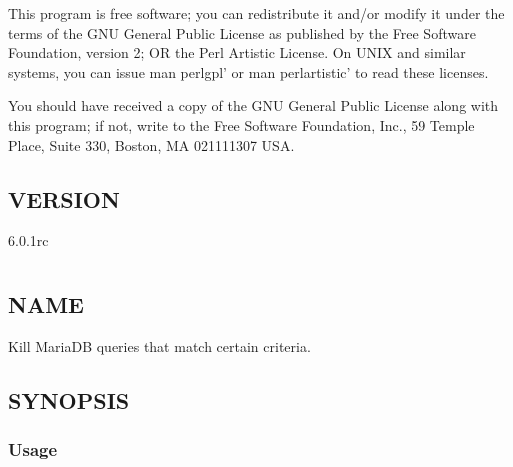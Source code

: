 \documentclass[letterpaper,10pt,english]{sphinxmanual}
\begin{document}
\sphinxAtStartPar
This program is free software; you can redistribute it and/or modify it under
the terms of the GNU General Public License as published by the Free Software
Foundation, version 2; OR the Perl Artistic License.  On UNIX and similar
systems, you can issue \textasciigrave{}man perlgpl’ or \textasciigrave{}man perlartistic’ to read these
licenses.

\sphinxAtStartPar
You should have received a copy of the GNU General Public License along with
this program; if not, write to the Free Software Foundation, Inc., 59 Temple
Place, Suite 330, Boston, MA  02111\sphinxhyphen{}1307  USA.


\section{VERSION}
\label{\detokenize{mariadb-iostat:version}}
\sphinxAtStartPar
{} 6.0.1rc


\chapter{}
\label{\detokenize{mariadb-kill:mariadb-kill}}\label{\detokenize{mariadb-kill::doc}}

\section{NAME}
\label{\detokenize{mariadb-kill:name}}
\sphinxAtStartPar
{} \sphinxhyphen{} Kill MariaDB queries that match certain criteria.


\section{SYNOPSIS}
\label{\detokenize{mariadb-kill:synopsis}}

\subsection{Usage}
\label{\detokenize{mariadb-kill:usage}}
\begin{sphinxVerbatim}[commandchars=\\\{\}]
 \PYG{p}{[}\PYG{p}{]} \PYG{p}{[}\PYG{p}{]}
\end{sphinxVerbatim}
\end{document}

